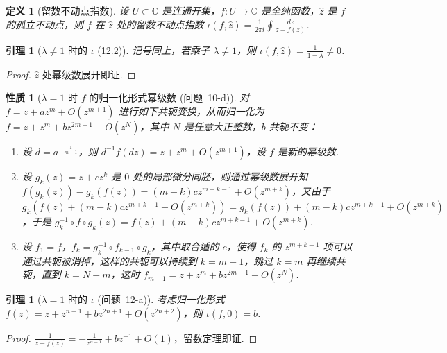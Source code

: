 \documentclass[11pt, a4paper, oneside]{ctexart}
\newtheorem{definition}[theorem]{定义}
\newtheorem{lemma}[theorem]{引理}
\newtheorem{property}[theorem]{性质}
\newcommand{\C}{\mathbb{C}}
\begin{document}
    \begin{definition}[留数不动点指数]
        设 $U\subset\C$ 是连通开集，$f:U\to \C$ 是全纯函数，$\hat{z}$ 是 $f$ 的孤立不动点，则 $f$ 在 $\hat{z}$ 处的留数不动点指数 $\iota(f,\hat{z})=\frac{1}{2\pi i}\oint\frac{dz}{z-f(z)}$.
    \end{definition}

    \begin{lemma}[$\lambda\neq 1$ 时的 $\iota$ (12.2)]
        记号同上，若乘子 $\lambda\neq 1$，则 $\iota(f,\hat{z})=\frac{1}{1-\lambda}\neq 0$.
    \end{lemma}
    \begin{proof}
        $\hat{z}$ 处幂级数展开即证.
    \end{proof}
    
    \begin{property}[$\lambda=1$ 时 $f$ 的归一化形式幂级数 (问题~10-d)]
        对 $f=z+az^{m}+O(z^{m+1})$ 进行如下共轭变换，从而归一化为 $f=z+z^m+bz^{2m-1}+O(z^N)$，其中 $N$ 是任意大正整数，$b$ 共轭不变：
        \begin{enumerate}[(1)]
            \item 设 $d=a^{-\frac{1}{m-1}}$，则 $d^{-1}f(dz)=z+z^m+O(z^{m+1})$，设 $f$ 是新的幂级数.
            \item 设 $g_k(z)=z+cz^k$ 是 $0$ 处的局部微分同胚，则通过幂级数展开知 $f(g_k(z))-g_k(f(z))=(m-k)cz^{m+k-1}+O(z^{m+k})$，又由于 $g_k(f(z)+(m-k)cz^{m+k-1}+O(z^{m+k}))=g_k(f(z))+(m-k)cz^{m+k-1}+O(z^{m+k})$，于是 $g_k^{-1}\circ f\circ g_k(z)=f(z)+(m-k)cz^{m+k-1}+O(z^{m+k})$.
            \item 设 $f_1=f$，$f_k=g_k^{-1}\circ f_{k-1}\circ g_k$，其中取合适的 $c$，使得 $f_k$ 的 $z^{m+k-1}$ 项可以通过共轭被消掉，这样的共轭可以持续到 $k=m-1$，跳过 $k=m$ 再继续共轭，直到 $k=N-m$，这时 $f_{m-1}=z+z^m+bz^{2m-1}+O(z^N)$.
        \end{enumerate}
    \end{property}
    
    \begin{lemma}[$\lambda=1$ 时的 $\iota$ (问题~12-a)]
        考虑归一化形式 $f(z)=z+z^{n+1}+bz^{2n+1}+O(z^{2n+2})$，则 $\iota(f,0)=b$.
    \end{lemma}
    \begin{proof}
        $\frac{1}{z-f(z)}=-\frac{1}{z^{n+1}}+bz^{-1}+O(1)$，留数定理即证.
    \end{proof}
\end{document}
